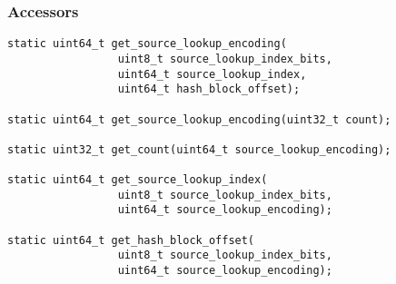 \documentclass[12pt,twoside]{article}
\begin{document}
\subsubsection{Accessors}
\begin{small}
\begin{verbatim}
static uint64_t get_source_lookup_encoding(
                 uint8_t source_lookup_index_bits,
                 uint64_t source_lookup_index,
                 uint64_t hash_block_offset);

static uint64_t get_source_lookup_encoding(uint32_t count);

static uint32_t get_count(uint64_t source_lookup_encoding);

static uint64_t get_source_lookup_index(
                 uint8_t source_lookup_index_bits,
                 uint64_t source_lookup_encoding);

static uint64_t get_hash_block_offset(
                 uint8_t source_lookup_index_bits,
                 uint64_t source_lookup_encoding);
\end{verbatim}
\end{small}
\end{document}
